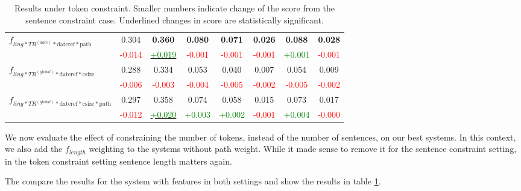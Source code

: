 \documentclass[a4paper,BCOR=10mm]{report}
\numberwithin{lemma}{chapter}
\numberwithin{definition}{chapter}
\begin{document}
\begin{table}
\begin{tabular}{|l|c|cc|cc|cc|}
\multirow{2}{*}{$f_{ling*TR^{(date)}*\text{dateref}*\text{path}}$}  & 0.304 & \textbf{0.360}    & \textbf{0.080}    & \textbf{0.071}    & \textbf{0.026}    & \textbf{0.088}    & \textbf{0.028} \\
    & \small \textcolor{red}{-0.014}    & \underline{\small \textcolor{green}{+0.019}}  & \small \textcolor{red}{-0.001}    & \small \textcolor{red}{-0.001}    & \small \textcolor{red}{-0.001}    & \small \textcolor{green}{+0.001}  & \small \textcolor{red}{-0.001} \\\hline
\multirow{2}{*}{$f_{ling*TR^{(global)}*\text{dateref}*\text{csize}}$}   & 0.288 & 0.334 & 0.053 & 0.040 & 0.007 & 0.054 & 0.009 \\
    & \small \textcolor{red}{-0.006}    & \small \textcolor{red}{-0.003}    & \small \textcolor{red}{-0.004}    & \small \textcolor{red}{-0.005}    & \small \textcolor{red}{-0.002}    & \small \textcolor{red}{-0.005}    & \small \textcolor{red}{-0.002} \\\hline
\multirow{2}{*}{$f_{ling*TR^{(global)}*\text{dateref}*\text{csize}*\text{path}}$}   & 0.297 & 0.358 & 0.074 & 0.058 & 0.015 & 0.073 & 0.017 \\
    & \small \textcolor{red}{-0.012}    & \underline{\small \textcolor{green}{+0.020}}  & \small \textcolor{green}{+0.003}  & \small \textcolor{green}{+0.002}  & \small \textcolor{red}{-0.001}    & \small \textcolor{green}{+0.004}  & \small \textcolor{red}{-0.000} \\\hline
\end{tabular}
\caption{Results under token constraint. Smaller numbers indicate change of the score from the sentence constraint case. Underlined changes in score are statistically significant.}
\label{tab:results-token}
\end{table}

We now evaluate the effect of constraining the number of tokens, instead of the number of sentences, on our best systems. In this context, we also add the $f_{length}$ weighting to the systems without path weight. While it made sense to remove it for the sentence constraint setting, in the token constraint setting sentence length matters again.

The compare the results for the system with features in both settings and show the results in table \ref{tab:results-token}.
\end{document}
